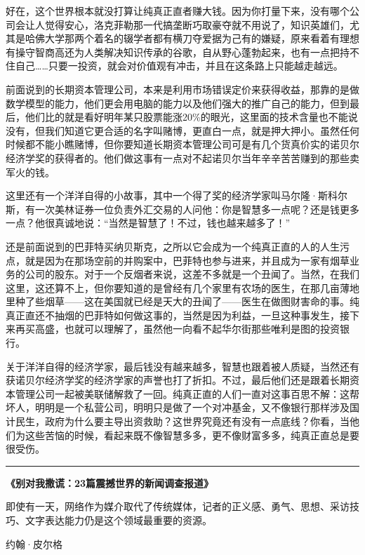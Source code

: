 好在，这个世界根本就没打算让纯真正直者赚大钱。因为你打量下来，没有哪个公司会让人觉得安心，洛克菲勒那一代搞垄断巧取豪夺就不用说了，知识英雄们，尤其是哈佛大学那两个着名的辍学者都有横刀夺爱据为己有的嫌疑，原来看着有理想有操守智商高还为人类解决知识传承的谷歌，自从野心蓬勃起来，也有一点把持不住自己\ldots\ldots 只要一投资，就会对价值观有冲击，并且在这条路上只能越走越远。

前面说到的长期资本管理公司，本来是利用市场错误定价来获得收益，那靠的是做数学模型的能力，他们更会用电脑的能力以及他们强大的推广自己的能力，但到最后，他们比的就是看好明年某只股票能涨20\%的眼光，这里面的技术含量也不能说没有，但我们知道它更合适的名字叫赌博，更直白一点，就是押大押小。虽然任何时候都不能小瞧赌博，但你要知道长期资本管理公司可是有几个货真价实的诺贝尔经济学奖的获得者的。他们做这事有一点对不起诺贝尔当年辛辛苦苦赚到的那些卖军火的钱。

这里还有一个洋洋自得的小故事，其中一个得了奖的经济学家叫马尔隆·斯科尔斯，有一次美林证券一位负责外汇交易的人问他：你是智慧多一点呢？还是钱更多一点？他很真诚地说：``当然是智慧了！不过，钱也越来越多了！''

还是前面说到的巴菲特买纳贝斯克，之所以它会成为一个纯真正直的人的人生污点，就是因为在那场空前的并购案中，巴菲特也参与进来，并且成为一家有烟草业务的公司的股东。对于一个反烟者来说，这差不多就是一个丑闻了。当然，在我们这里，这还算不上，但你要知道的是曾经有几个家里有农场的医生，在那几亩薄地里种了些烟草------这在美国就已经是天大的丑闻了------医生在做图财害命的事。纯真正直还不抽烟的巴菲特如何做这事的，当然是因为利益，一旦这种事发生，接下来再买高盛，也就可以理解了，虽然他一向看不起华尔街那些唯利是图的投资银行。

关于洋洋自得的经济学家，最后钱没有越来越多，智慧也跟着被人质疑，当然还有获诺贝尔经济学奖的经济学家的声誉也打了折扣。不过，最后他们还是跟着长期资本管理公司一起被美联储解救了一回。纯真正直的人们一直对这事百思不解：这帮坏人，明明是一个私营公司，明明只是做了一个对冲基金，又不像银行那样涉及国计民生，政府为什么要主导出资救助？这世界究竟还有没有一点底线？你看，当他们为这些苦恼的时候，看起来既不像智慧多多，更不像财富多多，纯真正直总是要很受伤。

\begin{center}\rule{0.5\linewidth}{0.5pt}\end{center}

\textbf{《别对我撒谎：23篇震撼世界的新闻调查报道》}

即使有一天，网络作为媒介取代了传统媒体，记者的正义感、勇气、思想、采访技巧、文字表达能力仍是这个领域最重要的资源。

约翰·皮尔格

